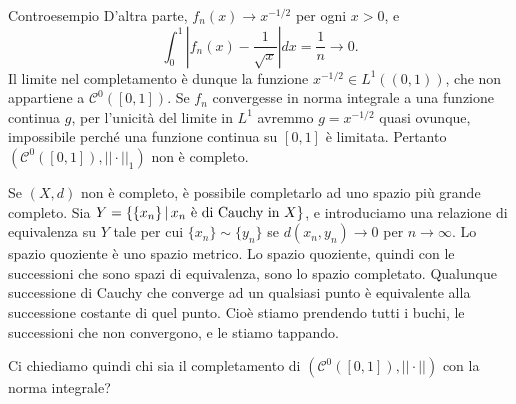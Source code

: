 \documentclass[a4paper]{article}
\begin{document}
\begin{radioactive}
\begin{snippetexample}{Controesempio}
    D'altra parte, \(f_n(x)\to x^{-1/2}\) per ogni \(x>0\), e
    \[
        \int_0^1\left|f_n(x)-\frac1{\sqrt x}\right|dx=\frac1n\longrightarrow0.
    \]
    Il limite nel completamento è dunque la funzione \(x^{-1/2}\in L^1((0,1))\), che non
    appartiene a \(\mathcal C^0([0,1])\). Se \(f_n\) convergesse in norma integrale a una
    funzione continua \(g\), per l'unicità del limite in \(L^1\) avremmo
    \(g=x^{-1/2}\) quasi ovunque, impossibile perché una funzione continua su \([0,1]\)
    è limitata. Pertanto \((\mathcal C^0([0,1]),||\cdot||_1)\) non è completo.
\end{snippetexample}
\end{radioactive}

\begin{radioactive}
Se \((X, d)\) non è completo, è possibile completarlo ad uno spazio
più grande completo. Sia \(Y = \{\{x_n\} \,|\, x_n \text{ è di Cauchy in } X\}\),
e introduciamo una relazione di equivalenza su \(Y\) tale per cui
\(\{x_n\} \sim \{y_n\}\) se \(d(x_n, y_n) \to 0\) per \(n \to \infty\).
Lo spazio quoziente è uno spazio metrico.
Lo spazio quoziente, quindi con le successioni che sono spazi di equivalenza,
sono lo spazio completato.
Qualunque successione di Cauchy che converge ad un qualsiasi punto è equivalente
alla successione costante di quel punto. Cioè stiamo prendendo tutti i buchi, le successioni
che non convergono, e le stiamo tappando.
\end{radioactive}

\begin{radioactive}
Ci chiediamo quindi chi sia il completamento di \((\mathcal C^0([0,1]), ||\cdot||)\)
con la norma integrale?
\end{radioactive}
\end{document}
